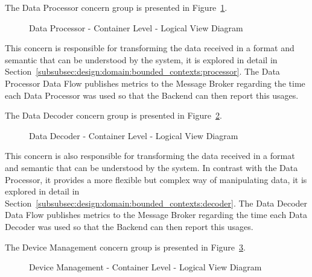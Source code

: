 The Data Processor concern group is presented in Figure~\ref{fig:design:architecture:platform:containers:logical:processor}.

\begin{figure}[H]
   \centering
   \resizebox{\columnwidth}{!}
       {
       
       }
   \caption[Data Processor - Container Level - Logical View Diagram]{Data Processor - Container Level - Logical View Diagram}
   \label{fig:design:architecture:platform:containers:logical:processor}
\end{figure}

This concern is responsible for transforming the data received in a format and semantic that can be understood by the system, it is explored in detail in Section~\ref{subsubsec:design:domain:bounded_contexts:processor}. The Data Processor Data Flow publishes metrics to the Message Broker regarding the time each Data Processor was used so that the Backend can then report this usages.

The Data Decoder concern group is presented in Figure~\ref{fig:design:architecture:platform:containers:logical:decoder}.

\begin{figure}[H]
   \centering
   \resizebox{\columnwidth}{!}
       {
       
       }
   \caption[Data Decoder - Container Level - Logical View Diagram]{Data Decoder - Container Level - Logical View Diagram}
   \label{fig:design:architecture:platform:containers:logical:decoder}
\end{figure}

This concern is also responsible for transforming the data received in a format and semantic that can be understood by the system. In contrast with the Data Processor, it provides a more flexible but complex way of manipulating data, it is explored in detail in Section~\ref{subsubsec:design:domain:bounded_contexts:decoder}. The Data Decoder Data Flow publishes metrics to the Message Broker regarding the time each Data Decoder was used so that the Backend can then report this usages.

The Device Management concern group is presented in Figure~\ref{fig:design:architecture:platform:containers:logical:device}.

\begin{figure}[H]
   \centering
   \resizebox{\columnwidth}{!}
       {
       
       }
   \caption[Device Management - Container Level - Logical View Diagram]{Device Management - Container Level - Logical View Diagram}
   \label{fig:design:architecture:platform:containers:logical:device}
\end{figure}

